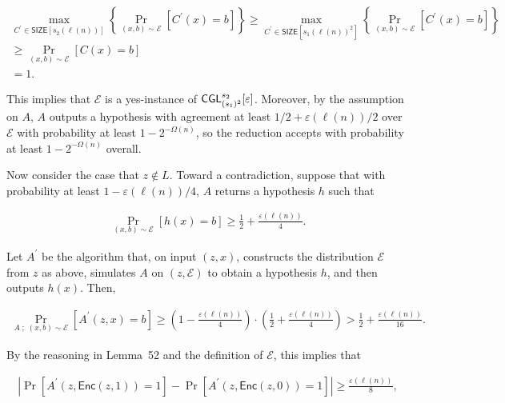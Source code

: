 \[\begin{gathered}
\displaystyle\max_{C^{\prime}\in{\mathsf{SIZE}}[s_{2}(\ell(n))]}\left\{\Pr_{(x,b)\sim\mathcal{E}}[C^{\prime}(x)=b]\right\} \displaystyle\geq\max_{C^{\prime}\in{\mathsf{SIZE}}[s_{1}(\ell(n))^{2}]}\left\{\Pr_{(x,b)\sim\mathcal{E}}[C^{\prime}(x)=b]\right\} \\
\displaystyle\geq\Pr_{(x,b)\sim\mathcal{E}}[C(x)=b] \\
\displaystyle=1.
\end{gathered}\]


This implies that $\mathcal{E}$ is a yes-instance of ${\sf CGL}_{(s_{1})^{2}}^{s_{2}}[\varepsilon]$. Moreover, by the assumption on $A$, $A$ outputs a hypothesis with agreement at least $1/2+\varepsilon(\ell(n))/2$ over $\mathcal{E}$ with probability at least $1-2^{-\Omega(n)}$, so the reduction accepts with probability at least $1-2^{-\Omega(n)}$ overall.\par




Now consider the case that $z\notin L$. Toward a contradiction, suppose that with probability at least $1-\varepsilon(\ell(n))/4$, $A$ returns a hypothesis $h$ such that\par


\[\begin{gathered}
\Pr_{(x,b)\sim\mathcal{E}}[h(x)=b]\geq\frac{1}{2}+\frac{\varepsilon(\ell(n))}{4}.
\end{gathered}\]


Let $A^{\prime}$ be the algorithm that, on input $(z,x)$, constructs the distribution $\mathcal{E}$ from $z$ as above, simulates $A$ on $(z,\mathcal{E})$ to obtain a hypothesis $h$, and then outputs $h(x)$. Then,\par


\[\begin{gathered}
\Pr_{A\;;\;(x,b)\sim\mathcal{E}}[A^{\prime}(z,x)=b]\geq\left(1-\frac{\varepsilon(\ell(n))}{4}\right)\cdot\left(\frac{1}{2}+\frac{\varepsilon(\ell(n))}{4}\right)>\frac{1}{2}+\frac{\varepsilon(\ell(n))}{16}.
\end{gathered}\]


By the reasoning in Lemma 52 and the definition of $\mathcal{E}$, this implies that\par


\[\begin{gathered}
\left|\Pr[A^{\prime}(z,{\mathsf{Enc}}(z,1))=1]-\Pr[A^{\prime}(z,{\mathsf{Enc}}(z,0))=1]\right|\geq\frac{\varepsilon(\ell(n))}{8},
\end{gathered}\]


